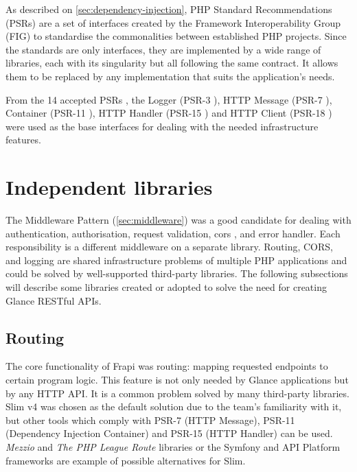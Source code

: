 As described on \autoref{sec:dependency-injection}, PHP Standard Recommendations (PSRs) are a set of interfaces created by the Framework Interoperability Group (FIG) \cite{fig-website} to standardise the commonalities between established PHP projects. Since the standards are only interfaces, they are implemented by a wide range of libraries, each with its singularity but all following the same contract. It allows them to be replaced by any implementation that suits the application's needs.

From the 14 accepted PSRs \cite{fig-website-psrs}, the Logger (PSR-3 \cite{psr-3}), HTTP Message (PSR-7 \cite{psr-7}), Container (PSR-11 \cite{psr-11}), HTTP Handler (PSR-15 \cite{psr-15}) and HTTP Client (PSR-18 \cite{psr-18}) were used as the base interfaces for dealing with the needed infrastructure features.

\section{Independent libraries}
\label{sec:independent-libs}

The Middleware Pattern (\autoref{sec:middleware}) was a good candidate for dealing with authentication, authorisation, request validation, \acrfull{cors} \cite{cors}, and error handler. Each responsibility is a different middleware on a separate library. Routing, CORS, and logging are shared infrastructure problems of multiple PHP applications and could be solved by well-supported third-party libraries. The following subsections will describe some libraries created or adopted to solve the need for creating Glance RESTful APIs.

\subsection{Routing}

The core functionality of Frapi was routing: mapping requested endpoints to certain program logic. This feature is not only needed by Glance applications but by any HTTP API. It is a common problem solved by many third-party libraries. Slim v4 \cite{slim-v4} was chosen as the default solution due to the team's familiarity with it, but other tools which comply with PSR-7 (HTTP Message), PSR-11 (Dependency Injection Container) and PSR-15 (HTTP Handler) can be used. \textit{Mezzio} \cite{mezzio-website} and \textit{The PHP League Route} \cite{php-league-route} libraries or the Symfony \cite{symfony-website} and API Platform \cite{api-platform-website} frameworks are example of possible alternatives for Slim.

